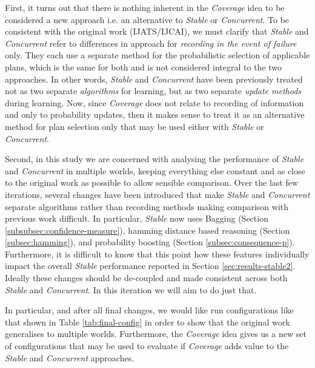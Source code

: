 \documentclass[a4paper]{article}
\newcommand{\cc}{\emph{Concurrent}\xspace}
\newcommand{\st}{\emph{Stable}\xspace}
\newcommand{\cov}{\emph{Coverage}\xspace}
\begin{document}
First, it turns out that there is nothing inherent in the \cov idea to be considered a new approach i.e. an alternative to \st or \cc. To be consistent with the original work (IJATS/IJCAI), we must clarify that \st and \cc refer to differences in approach for \textit{recording in the event of failure} only. They each use a separate method for the probabilistic selection of applicable plans, which is the same for both and is not considered integral to the two approaches. In other words, \st and \cc have been previously treated not as two separate \textit{algorithms} for learning, but as two separate \textit{update methods} during learning. Now, since \cov does not relate to recording of information and only to probability updates, then it makes sense to treat it as an alternative method for plan selection only that may be used either with \st or \cc. 

Second, in this study we are concerned with analysing the performance of \st and \cc in multiple worlds, keeping everything else constant and as close to the original work as possible to allow sensible comparison. Over the last few iterations, several changes have been introduced that make \st and \cc separate algorithms rather than recording methods making comparison with previous work difficult. In particular, \st now uses Bagging (Section \ref{subsubsec:confidence-measure}), hamming distance based reasoning (Section \ref{subsec:hamming}), and probability boosting (Section \ref{subsec:consequence-p}). Furthermore, it is difficult to know that this point how these features individually impact the overall \st performance reported in Section \ref{sec:results-stable2}. Ideally these changes should be de-coupled and made consistent across both \st and \cc. In this iteration we will aim to do just that. 

In particular, and after all final changes, we would like run configurations like that shown in Table \ref{tab:final-config} in order to show that the original work generalises to multiple worlds. Furthermore, the \cov idea gives us a new set of configurations that may be used to evaluate if \cov adds value to the \st and \cc approaches.
\end{document}
